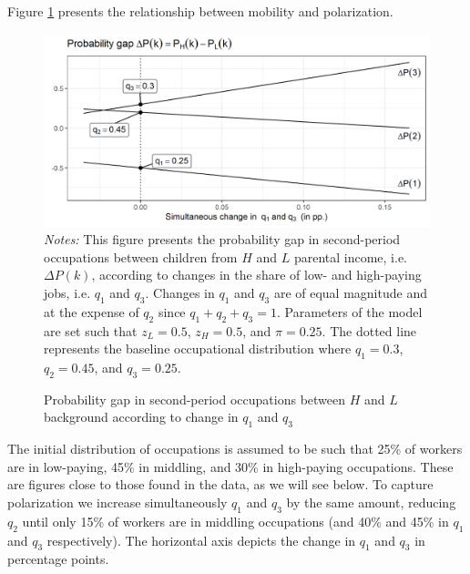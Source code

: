 Figure \ref{chap2-fig:theory-proba-gap} presents the relationship between mobility and polarization.
\begin{figure}[!tb]
    \centering
    \caption{Probability gap in second-period occupations between $H$ and $L$ background according to change in $q_1$ and $q_3$}
    \label{chap2-fig:theory-proba-gap}
    \includegraphics[width=\linewidth]{chap2/graphic/theory-proba-gap.png}
	\vspace{-3em}
	\justify\singlespacing\footnotesize{\textit{Notes:} This figure presents the probability gap in second-period occupations between children from $H$ and $L$ parental income, i.e. $\Delta P(k)$, according to changes in the share of low- and high-paying jobs, i.e. $q_1$ and $q_3$.
	Changes in $q_1$ and $q_3$ are of equal magnitude and at the expense of $q_2$ since $q_1+q_2+q_3=1$.
	Parameters of the model are set such that $z_L = 0.5$, $z_H = 0.5$, and $\pi = 0.25$. The dotted line represents the baseline occupational distribution where $q_1=0.3$, $q_2=0.45$, and $q_3=0.25$.}
\end{figure}
The initial distribution of occupations is assumed to be such that 25\% of workers are in low-paying, 45\% in middling, and 30\% in high-paying occupations. These are figures close to those found in the data, as we will see below. To capture polarization we increase simultaneously $q_{1}$ and $q_{3}$ by the same amount, reducing $q_2$ until only 15\% of workers are in middling occupations (and 40\% and 45\% in $q_1$ and $ q_3$ respectively). The horizontal axis depicts the change in $q_{1}$ and $q_{3}$ in percentage points.

